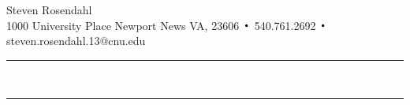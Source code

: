 \documentclass{article}
\DeclareMathOperator*{\Bigcdot}{\scalerel*{\cdot}{\bigodot}}
\begin{document}
\noindent
\begin{center}
{\huge Steven Rosendahl}\\
{\small 1000 University Place Newport News VA, 23606 $\Bigcdot$ 540.761.2692 $\Bigcdot$
steven.rosendahl.13@cnu.edu}\\
\end{center}
\hrule
\noindent \\

\hrule
\noindent \\

\end{document}
